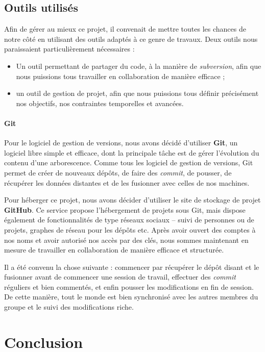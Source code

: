 \subsection{Outils utilisés}

Afin de gérer au mieux ce projet, il convenait de mettre toutes les chances de notre côté en utilisant des outils adaptés à ce genre de travaux. Deux outils nous paraissaient particulièrement nécessaires :
\begin{itemize}
  \item Un outil permettant de partager du code, à la manière de \textit{subversion}, afin que nous puissions tous travailler en collaboration de manière efficace ;
  \item un outil de gestion de projet, afin que nous puissions tous définir précisément nos objectifs, nos contraintes temporelles et avancées.
\end{itemize}

\paragraph*{Git\\}
\medskip Pour le logiciel de gestion de versions, nous avons décidé d'utiliser \textbf{Git}, un logiciel libre simple et efficace, dont la principale tâche est de gérer l'évolution du contenu d'une arborescence. Comme tous les logiciel de gestion de versions, Git permet de créer de nouveaux dépôts, de faire des \textit{commit}, de pousser, de récupérer les données distantes et de les fusionner avec celles de nos machines.

Pour héberger ce projet, nous avons décider d'utiliser le site de stockage de projet \textbf{GitHub}. Ce service propose l'hébergement de projets sous Git, mais dispose également de fonctionnalités de type réseaux sociaux -- suivi de personnes ou de projets, graphes de réseau pour les dépôts etc. Après avoir ouvert des comptes à nos noms et avoir autorisé nos accès par des clés, nous sommes maintenant en mesure de travailler en collaboration de manière efficace et structurée.

Il a été convenu la chose suivante : commencer par récupérer le dépôt disant et le fusionner avant de commencer une session de travail, effectuer des \textit{commit} réguliers et bien commentés, et enfin pousser les modifications en fin de session. De cette manière, tout le monde est bien synchronisé avec les autres membres du groupe et le suivi des modifications riche.

\section{Conclusion}

